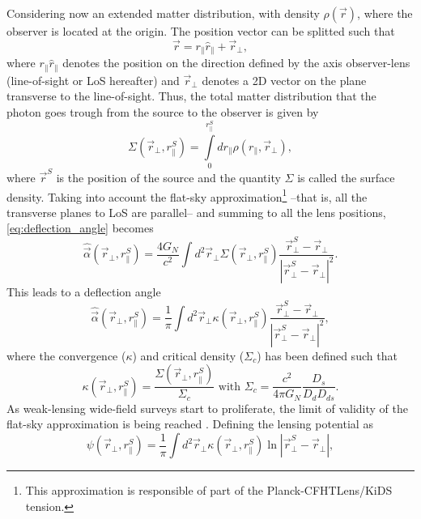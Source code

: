 Considering now an extended matter distribution, with density $\rho(\vec r)$, where the observer is located at the origin. The position vector can be splitted such that
\begin{equation}
\vec r = r_\parallel \hat r_\parallel + \vec r_\perp,
\end{equation}
where $r_\parallel\hat r_\parallel$ denotes the position on the direction defined by the axis observer-lens (line-of-sight or LoS hereafter) and $\vec r_\perp$ denotes a 2D vector on the plane transverse to the line-of-sight. Thus, the total matter distribution that the photon goes trough from the source to the observer is given by
\begin{equation}
\Sigma(\vec r_\perp,r_\parallel^S) = \int\limits_0^{r_\parallel^S} dr_\parallel\rho(r_\parallel,\vec r_\perp),
\label{eq:surface_density}
\end{equation}
where $\vec r^S$ is the position of the source and the quantity $\Sigma$ is called the surface density. Taking into account the flat-sky approximation\footnote{This approximation is responsible of part of the Planck-CFHTLens/KiDS tension.} --that is, all the transverse planes to LoS are parallel-- and summing to all the lens positions, \autoref{eq:deflection_angle} becomes
\begin{equation}
\hat\vec\alpha(\vec r_\perp,r_\parallel^S) = \frac{4G_N}{c^2}\int d^2\vec r_\perp \Sigma(\vec r_\perp,r_\parallel^S)\frac{\vec r^S_\perp-\vec r_\perp}{|\vec r^S_\perp-\vec r_\perp|^2}.
\end{equation}
This leads to a deflection angle
\begin{equation}
\hat \vec\alpha(\vec r_\perp,r_\parallel^S) = \frac1{\pi}\int d^2\vec r_\perp\kappa(\vec r_\perp,r_\parallel^S)\frac{\vec r^S_\perp-\vec r_\perp}{|\vec r^S_\perp-\vec r_\perp|^2},
\end{equation}
where the convergence ($\kappa$) and critical density ($\Sigma_c$) has been defined such that
\begin{equation}
\kappa(\vec r_\perp,r_\parallel^S) = \frac{\Sigma(\vec r_\perp,r_\parallel^S)}{\Sigma_c} \mbox{ with } \Sigma_c = \frac{c^2}{4\pi G_N}\frac{D_s}{D_dD_{ds}}.
\label{eq:kappa_definition}
\end{equation}
As weak-lensing wide-field surveys start to proliferate, the limit of validity of the flat-sky approximation is being reached \cite{2016arXiv161104954K,2017arXiv170205301K,2017arXiv170401054L}. Defining the lensing potential as
\begin{equation}
\psi(\vec r_\perp,r_\parallel^S) = \frac1{\pi}\int d^2\vec r_\perp\kappa(\vec r_\perp,r_\parallel^S)\ln|\vec r^S_\perp-\vec r_\perp|,
\end{equation}
